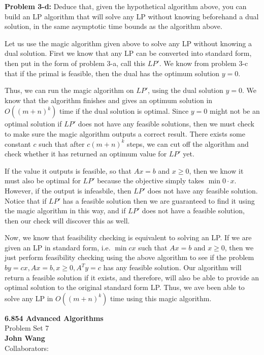 \documentclass[psamsfonts]{amsart}
\newenvironment{sol}{\vspace{0.25cm}{\large \bfseries Solution:}}{\qedsymbol}
\newenvironment{prob}[1]{\begin{framed}{\large \bfseries Problem #1:}}{\end{framed}}
\newcommand{\makenewtitle}{
    \begin{center}
    {\huge \bfseries 6.854 Advanced Algorithms} \\
    Problem Set 7\\
    \vspace{0.25cm}
    {\bfseries John Wang} \\
    Collaborators: 
    \end{center}
    \vspace{0.5cm}
}
\begin{document}
\begin{prob}{3-d}
Deduce that, given the hypothetical algorithm above, you can build an LP algorithm that will solve any LP without knowing beforehand a dual solution, in the same asymptotic time bounds as the algorithm above.
\end{prob}
\begin{sol}
Let us use the magic algorithm given above to solve any LP without knowing a dual solution. First we know that any LP can be converted into standard form, then put in the form of problem 3-a, call this $LP'$. We know from problem 3-c that if the primal is feasible, then the dual has the optimum solution $y=0$. 

Thus, we can run the magic algorithm on $LP'$, using the dual solution $y=0$. We know that the algorithm finishes and gives an optimum solution in $O((m+n)^k)$ time if the dual solution is optimal. Since $y=0$ might not be an optimal solution if $LP'$ does not have any feasible solutions, then we must check to make sure the magic algorithm outputs a correct result. There exists some constant $c$ such that after $c(m+n)^k$ steps, we can cut off the algorithm and check whether it has returned an optimum value for $LP'$ yet.

If the value it outputs is feasible, so that $Ax = b$ and $x \geq 0$, then we know it must also be optimal for $LP'$ because the objective simply takes $\min 0 \cdot x$. However, if the output is infeasbile, then $LP'$ does not have any feasible solution. Notice that if $LP'$ has a feasible solution then we are guaranteed to find it using the magic algorithm in this way, and if $LP'$ does not have a feasible solution, then our check will discover this as well.

Now, we know that feasibility checking is equivalent to solving an LP. If we are given an LP in standard form, i.e. $\min cx$ such that $Ax = b$ and $x \geq 0$, then we just perform feasibility checking using the above algorithm to see if the problem $by = cx, Ax = b, x \geq 0, A^T y = c$ has any feasible solution. Our algorithm will return a feasible solution if it exists, and therefore, will also be able to provide an optimal solution to the original standard form LP. Thus, we ave been able to solve any LP in $O((m+n)^k)$ time using this magic algorithm.
\end{sol}

\newpage
\makenewtitle
\end{document}
